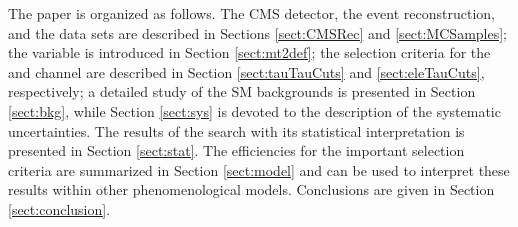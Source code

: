 The paper is organized as follows.  The CMS detector, the event reconstruction, and the data sets are described
in Sections \ref{sect:CMSRec} and \ref{sect:MCSamples}; the \mttwo variable is introduced in Section \ref{sect:mt2def}; 
the selection criteria for the \tauTau and \leptonTau channel are described in Section \ref{sect:tauTauCuts} and \ref{sect:eleTauCuts}, respectively;
a detailed study of the SM backgrounds is presented in Section \ref{sect:bkg}, while Section \ref{sect:sys} 
is devoted to the description of the systematic uncertainties.  The results of the search with its statistical interpretation is presented in 
Section \ref{sect:stat}. The efficiencies for the important selection criteria are summarized in Section \ref{sect:model} and can be
used to interpret these results within other phenomenological models. Conclusions are given in Section \ref{sect:conclusion}.



